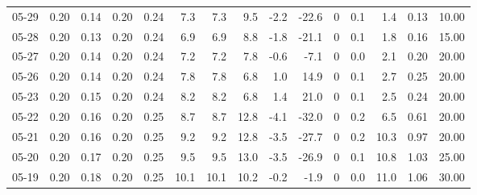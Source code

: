 \begin{threeparttable}
{\begin{tabular}{lrrrrrrrrrrrrrr}
  05-29 &          0.20 &          0.14 &          0.20 &        0.24 &                 7.3 &                7.3 &                 9.5 &       -2.2 &        -22.6 &              0 &                 0.1 &              1.4 &            0.13 &                  10.00 \\
  05-28 &          0.20 &          0.13 &          0.20 &        0.24 &                 6.9 &                6.9 &                 8.8 &       -1.8 &        -21.1 &              0 &                 0.1 &              1.8 &            0.16 &                  15.00 \\
  05-27 &          0.20 &          0.14 &          0.20 &        0.24 &                 7.2 &                7.2 &                 7.8 &       -0.6 &         -7.1 &              0 &                 0.0 &              2.1 &            0.20 &                  20.00 \\
  05-26 &          0.20 &          0.14 &          0.20 &        0.24 &                 7.8 &                7.8 &                 6.8 &        1.0 &         14.9 &              0 &                 0.1 &              2.7 &            0.25 &                  20.00 \\
  05-23 &          0.20 &          0.15 &          0.20 &        0.24 &                 8.2 &                8.2 &                 6.8 &        1.4 &         21.0 &              0 &                 0.1 &              2.5 &            0.24 &                  20.00 \\
  05-22 &          0.20 &          0.16 &          0.20 &        0.25 &                 8.7 &                8.7 &                12.8 &       -4.1 &        -32.0 &              0 &                 0.2 &              6.5 &            0.61 &                  20.00 \\
  05-21 &          0.20 &          0.16 &          0.20 &        0.25 &                 9.2 &                9.2 &                12.8 &       -3.5 &        -27.7 &              0 &                 0.2 &             10.3 &            0.97 &                  20.00 \\
  05-20 &          0.20 &          0.17 &          0.20 &        0.25 &                 9.5 &                9.5 &                13.0 &       -3.5 &        -26.9 &              0 &                 0.1 &             10.8 &            1.03 &                  25.00 \\
  05-19 &          0.20 &          0.18 &          0.20 &        0.25 &                10.1 &               10.1 &                10.2 &       -0.2 &         -1.9 &              0 &                 0.0 &             11.0 &            1.06 &                  30.00 \\

\end{tabular}}
\end{threeparttable}
